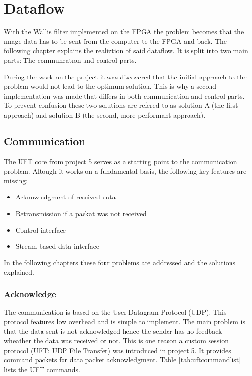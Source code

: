 %
%
\chapter{Dataflow} \label{chapt:dataflow}
With the Wallis filter implemented on the FPGA the problem becomes that the
image data has to be sent from the computer to the FPGA and back. The following
chapter explains the realiztion of said dataflow. It is split into two main
parts: The communcation and control parts.

During the work on the project it was discovered that the initial approach to
the problem would not lead to the optimum solution. This is why a second
implementation was made that differs in both communication and control parts. To
prevent confusion these two solutions are refered to as solution A (the first
approach) and solution B (the second, more performant approach).

\section{Communication}
The UFT core from project 5 serves as a starting point to the communication
problem. Altough it works on a fundamental basis, the following key features are
missing:

\begin{itemize}
	\item Acknowledgment of received data
	\item Retransmission if a packat was not received
	\item Control interface
	\item Stream based data interface
\end{itemize}

In the following chapters these four problems are addressed and the solutions
explained.

\subsection{Acknowledge}
The communication is based on the User Datagram Protocol (UDP). This protocol
features low overhead and is simple to implement. The main problem is that the
data sent is not acknowledged hence the sender has no feedback wheather the data
was received or not. This is one reason a custom session protocol (UFT: UDP
File Transfer) was introduced in project 5. It provides command packets for data
packet acknowledgment. Table \ref{tab:uftcommandlist} lists the UFT commands.


